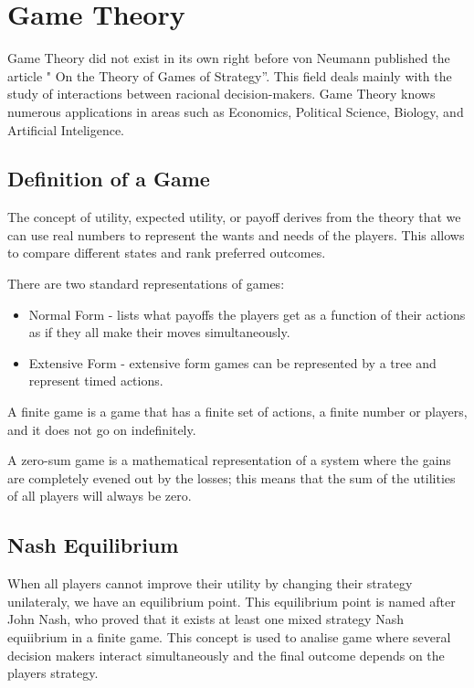 \section{Game Theory}
\label{sec:background:game_theory}

Game Theory did not exist in its own right before von Neumann published the article " On the Theory of Games of Strategy''. This field deals mainly with the study of interactions between racional decision-makers\cite{Neumann1944}. Game Theory knows numerous applications in areas such as Economics, Political Science, Biology, and Artificial Inteligence. 

\subsection{Definition of a Game}
\label{subsec:background:game_theory_definition}

The concept of utility, expected utility, or payoff derives from the theory that we can use real numbers to represent the wants and needs of the players. This allows to compare different states and rank preferred outcomes\cite{Neumann1944}.

There are two standard representations of games:
\begin{itemize}
\item Normal Form - lists what payoffs the players get as a function of their actions as if they all make their moves simultaneously. 
\item Extensive Form - extensive form games can be represented by a tree and represent timed actions.
\end{itemize}

A finite game is a game that has a finite set of actions, a finite number or players, and it does not go on indefinitely.

A zero-sum game is a mathematical representation of a system where the gains are completely evened out by the losses; this means that the sum of the utilities of all players will always be zero.



\subsection{Nash Equilibrium}
\label{subsec:background:game_theory_nash_equilibrium}

When all players cannot improve their utility by changing their strategy unilateraly, we have an equilibrium point. This equilibrium point is named after John Nash, who proved that it exists at least one mixed strategy Nash equiibrium in a finite game\cite{nash50}\cite{Nash51}. This concept is used to analise game where several decision makers interact simultaneously and the final outcome depends on the players strategy.



